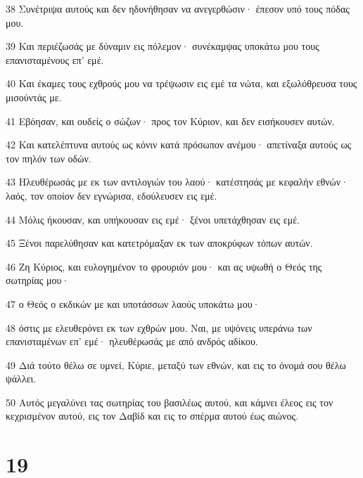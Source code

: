 \par 38 Συνέτριψα αυτούς και δεν ηδυνήθησαν να ανεγερθώσιν· έπεσον υπό τους πόδας μου.
\par 39 Και περιέζωσάς με δύναμιν εις πόλεμον· συνέκαμψας υποκάτω μου τους επανισταμένους επ' εμέ.
\par 40 Και έκαμες τους εχθρούς μου να τρέψωσιν εις εμέ τα νώτα, και εξωλόθρευσα τους μισούντάς με.
\par 41 Εβόησαν, και ουδείς ο σώζων· προς τον Κύριον, και δεν εισήκουσεν αυτών.
\par 42 Και κατελέπτυνα αυτούς ως κόνιν κατά πρόσωπον ανέμου· απετίναξα αυτούς ως τον πηλόν των οδών.
\par 43 Ηλευθέρωσάς με εκ των αντιλογιών του λαού· κατέστησάς με κεφαλήν εθνών· λαός, τον οποίον δεν εγνώρισα, εδούλευσεν εις εμέ.
\par 44 Μόλις ήκουσαν, και υπήκουσαν εις εμέ· ξένοι υπετάχθησαν εις εμέ.
\par 45 Ξένοι παρελύθησαν και κατετρόμαξαν εκ των αποκρύφων τόπων αυτών.
\par 46 Ζη Κύριος, και ευλογημένον το φρουριόν μου· και ας υψωθή ο Θεός της σωτηρίας μου·
\par 47 ο Θεός ο εκδικών με και υποτάσσων λαούς υποκάτω μου·
\par 48 όστις με ελευθερόνει εκ των εχθρών μου. Ναι, με υψόνεις υπεράνω των επανισταμένων επ' εμέ· ηλευθέρωσάς με από ανδρός αδίκου.
\par 49 Διά τούτο θέλω σε υμνεί, Κύριε, μεταξύ των εθνών, και εις το όνομά σου θέλω ψάλλει.
\par 50 Αυτός μεγαλύνει τας σωτηρίας του βασιλέως αυτού, και κάμνει έλεος εις τον κεχρισμένον αυτού, εις τον Δαβίδ και εις το σπέρμα αυτού έως αιώνος.

\chapter{19}

